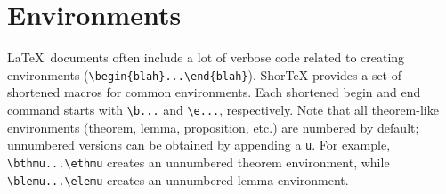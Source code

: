\documentclass{article}
\begin{document}
\newpage
\section{Environments}

\LaTeX~documents often include a lot of verbose code
related to creating environments (\verb!\begin{blah}...\end{blah}!). ShorTeX provides a set of 
shortened macros for common environments.
Each shortened begin and end command starts with \verb!\b...! and \verb!\e...!, respectively.
Note that all theorem-like environments (theorem, lemma, proposition, etc.) 
are numbered by default; unnumbered versions can be obtained by appending a \verb!u!. For example,
\verb!\bthmu...\ethmu! creates an unnumbered theorem environment, while
\verb!\blemu...\elemu! creates an unnumbered lemma environment.
\end{document}
